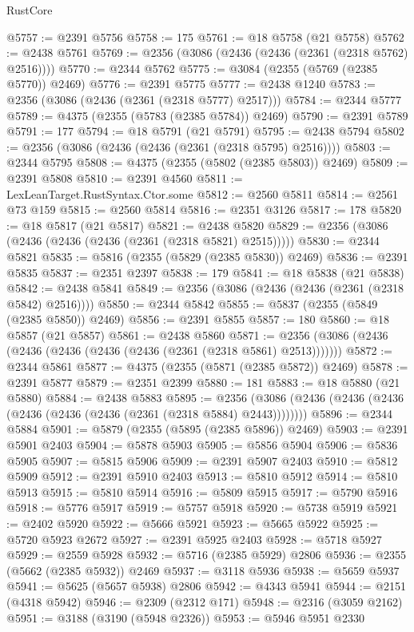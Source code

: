 \begin{lexlean}{RustCore}
\begin{coremodule}
@5757 := @2391 @5756
@5758 := 175
@5761 := @18 @5758 (@21 @5758)
@5762 := @2438 @5761
@5769 := @2356 (@3086 (@2436 (@2436 (@2361 (@2318 @5762) @2516))))
@5770 := @2344 @5762
@5775 := @3084 (@2355 (@5769 (@2385 @5770)) @2469)
@5776 := @2391 @5775
@5777 := @2438 @1240
@5783 := @2356 (@3086 (@2436 (@2361 (@2318 @5777) @2517)))
@5784 := @2344 @5777
@5789 := @4375 (@2355 (@5783 (@2385 @5784)) @2469)
@5790 := @2391 @5789
@5791 := 177
@5794 := @18 @5791 (@21 @5791)
@5795 := @2438 @5794
@5802 := @2356 (@3086 (@2436 (@2436 (@2361 (@2318 @5795) @2516))))
@5803 := @2344 @5795
@5808 := @4375 (@2355 (@5802 (@2385 @5803)) @2469)
@5809 := @2391 @5808
@5810 := @2391 @4560
@5811 := LexLeanTarget.RustSyntax.Ctor.some
@5812 := @2560 @5811
@5814 := @2561 @73 @159
@5815 := @2560 @5814
@5816 := @2351 @3126
@5817 := 178
@5820 := @18 @5817 (@21 @5817)
@5821 := @2438 @5820
@5829 := @2356 (@3086 (@2436 (@2436 (@2436 (@2361 (@2318 @5821) @2515)))))
@5830 := @2344 @5821
@5835 := @5816 (@2355 (@5829 (@2385 @5830)) @2469)
@5836 := @2391 @5835
@5837 := @2351 @2397
@5838 := 179
@5841 := @18 @5838 (@21 @5838)
@5842 := @2438 @5841
@5849 := @2356 (@3086 (@2436 (@2436 (@2361 (@2318 @5842) @2516))))
@5850 := @2344 @5842
@5855 := @5837 (@2355 (@5849 (@2385 @5850)) @2469)
@5856 := @2391 @5855
@5857 := 180
@5860 := @18 @5857 (@21 @5857)
@5861 := @2438 @5860
@5871 := @2356 (@3086 (@2436 (@2436 (@2436 (@2436 (@2436 (@2361 (@2318 @5861) @2513)))))))
@5872 := @2344 @5861
@5877 := @4375 (@2355 (@5871 (@2385 @5872)) @2469)
@5878 := @2391 @5877
@5879 := @2351 @2399
@5880 := 181
@5883 := @18 @5880 (@21 @5880)
@5884 := @2438 @5883
@5895 := @2356 (@3086 (@2436 (@2436 (@2436 (@2436 (@2436 (@2436 (@2361 (@2318 @5884) @2443))))))))
@5896 := @2344 @5884
@5901 := @5879 (@2355 (@5895 (@2385 @5896)) @2469)
@5903 := @2391 @5901 @2403
@5904 := @5878 @5903
@5905 := @5856 @5904
@5906 := @5836 @5905
@5907 := @5815 @5906
@5909 := @2391 @5907 @2403
@5910 := @5812 @5909
@5912 := @2391 @5910 @2403
@5913 := @5810 @5912
@5914 := @5810 @5913
@5915 := @5810 @5914
@5916 := @5809 @5915
@5917 := @5790 @5916
@5918 := @5776 @5917
@5919 := @5757 @5918
@5920 := @5738 @5919
@5921 := @2402 @5920
@5922 := @5666 @5921
@5923 := @5665 @5922
@5925 := @5720 @5923 @2672
@5927 := @2391 @5925 @2403
@5928 := @5718 @5927
@5929 := @2559 @5928
@5932 := @5716 (@2385 @5929) @2806
@5936 := @2355 (@5662 (@2385 @5932)) @2469
@5937 := @3118 @5936
@5938 := @5659 @5937
@5941 := @5625 (@5657 @5938) @2806
@5942 := @4343 @5941
@5944 := @2151 (@4318 @5942)
@5946 := @2309 (@2312 @171)
@5948 := @2316 (@3059 @2162)
@5951 := @3188 (@3190 (@5948 @2326))
@5953 := @5946 @5951 @2330

\end{coremodule}
\end{lexlean}
